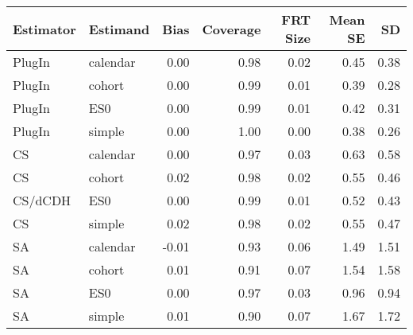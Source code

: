 \captionsetup[table]{labelformat=empty,skip=1pt}
\begin{longtable}{llrrrrr}
\toprule
Estimator & Estimand & Bias & Coverage & FRT Size & Mean SE & SD \\ 
\midrule
PlugIn & calendar & 0.00 & 0.98 & 0.02 & 0.45 & 0.38 \\ 
PlugIn & cohort & 0.00 & 0.99 & 0.01 & 0.39 & 0.28 \\ 
PlugIn & ES0 & 0.00 & 0.99 & 0.01 & 0.42 & 0.31 \\ 
PlugIn & simple & 0.00 & 1.00 & 0.00 & 0.38 & 0.26 \\ 
CS & calendar & 0.00 & 0.97 & 0.03 & 0.63 & 0.58 \\ 
CS & cohort & 0.02 & 0.98 & 0.02 & 0.55 & 0.46 \\ 
CS/dCDH & ES0 & 0.00 & 0.99 & 0.01 & 0.52 & 0.43 \\ 
CS & simple & 0.02 & 0.98 & 0.02 & 0.55 & 0.47 \\ 
SA & calendar & -0.01 & 0.93 & 0.06 & 1.49 & 1.51 \\ 
SA & cohort & 0.01 & 0.91 & 0.07 & 1.54 & 1.58 \\ 
SA & ES0 & 0.00 & 0.97 & 0.03 & 0.96 & 0.94 \\ 
SA & simple & 0.01 & 0.90 & 0.07 & 1.67 & 1.72 \\ 
 \bottomrule
\end{longtable}


